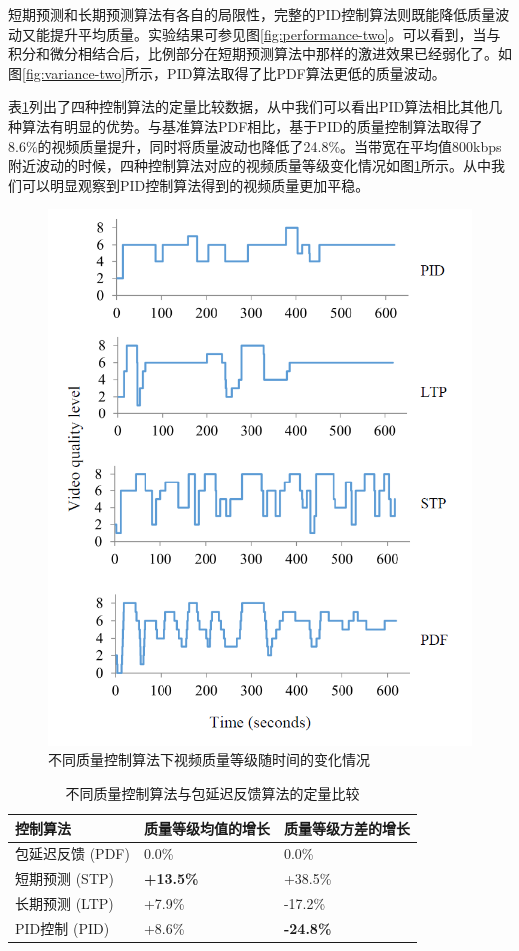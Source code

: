 短期预测和长期预测算法有各自的局限性，完整的PID控制算法则既能降低质量波动又能提升平均质量。实验结果可参见图\ref{fig:performance-two}。可以看到，当与积分和微分相结合后，比例部分在短期预测算法中那样的激进效果已经弱化了。如图\ref{fig:variance-two}所示，PID算法取得了比PDF算法更低的质量波动。

表\ref{tab:improvement}列出了四种控制算法的定量比较数据，从中我们可以看出PID算法相比其他几种算法有明显的优势。与基准算法PDF相比，基于PID的质量控制算法取得了8.6\%的视频质量提升，同时将质量波动也降低了24.8\%。当带宽在平均值800kbps附近波动的时候，四种控制算法对应的视频质量等级变化情况如图\ref{fig:fluctuation}所示。从中我们可以明显观察到PID控制算法得到的视频质量更加平稳。

\begin{figure}[!h]
	\centering
	\vspace{10pt}
	\includegraphics[width = 0.8\linewidth]{figures/fluctuation.png}
	\caption{不同质量控制算法下视频质量等级随时间的变化情况 \label{fig:fluctuation}}
\end{figure}

\begin{table}[!h]
	\centering
	\vspace{10pt}
	\caption{不同质量控制算法与包延迟反馈算法的定量比较}
	\label{tab:improvement}
	\begin{tabular}[b]{p{4.2cm}<{\centering}|p{4.2cm}<{\centering}|p{4.2cm}<{\centering}}
		\hline \hline
		控制算法 & 质量等级均值的增长 & 质量等级方差的增长 \\ \hline
		包延迟反馈 (PDF) & 0.0\% & 0.0\% \\ \hline
		短期预测 (STP) & \textbf{+13.5\%} & +38.5\% \\ \hline
		长期预测 (LTP) & +7.9\% & -17.2\% \\ \hline
		PID控制 (PID) & +8.6\% & \textbf{-24.8\%} \\ \hline
	\end{tabular}
	\vspace{10pt}
\end{table}

